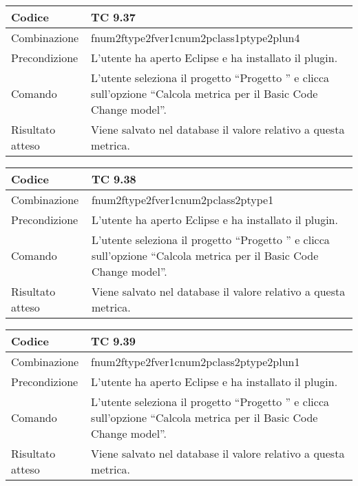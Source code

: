 \begin{table}[ht]
\begin{tabular}{|p{3cm}|p{9cm}|}
\hline
\cellcolor{lightgray}Codice				& TC 9.37								\\
\hline
\cellcolor{lightgray}Combinazione		& fnum2ftype2fver1cnum2pclass1ptype2plun4									\\
\hline
\cellcolor{lightgray}Precondizione		& L'utente ha aperto Eclipse e ha installato il plugin.		\\
\hline
\cellcolor{lightgray}Comando			& L'utente seleziona il progetto ``Progetto ''  e clicca sull'opzione ``Calcola metrica per il Basic Code Change model''.	\\
\hline
\cellcolor{lightgray}Risultato atteso	& Viene salvato nel database il valore relativo a questa metrica.\\
\hline
\end{tabular}
\end{table}

\begin{table}[ht]
\begin{tabular}{|p{3cm}|p{9cm}|}
\hline
\cellcolor{lightgray}Codice				& TC 9.38								\\
\hline
\cellcolor{lightgray}Combinazione		& fnum2ftype2fver1cnum2pclass2ptype1									\\
\hline
\cellcolor{lightgray}Precondizione		& L'utente ha aperto Eclipse e ha installato il plugin.		\\
\hline
\cellcolor{lightgray}Comando			& L'utente seleziona il progetto ``Progetto ''  e clicca sull'opzione ``Calcola metrica per il Basic Code Change model''.	\\
\hline
\cellcolor{lightgray}Risultato atteso	& Viene salvato nel database il valore relativo a questa metrica.\\
\hline
\end{tabular}
\end{table}

\begin{table}[ht]
\begin{tabular}{|p{3cm}|p{9cm}|}
\hline
\cellcolor{lightgray}Codice				& TC 9.39								\\
\hline
\cellcolor{lightgray}Combinazione		& fnum2ftype2fver1cnum2pclass2ptype2plun1									\\
\hline
\cellcolor{lightgray}Precondizione		& L'utente ha aperto Eclipse e ha installato il plugin.		\\
\hline
\cellcolor{lightgray}Comando			& L'utente seleziona il progetto ``Progetto ''  e clicca sull'opzione ``Calcola metrica per il Basic Code Change model''.	\\
\hline
\cellcolor{lightgray}Risultato atteso	& Viene salvato nel database il valore relativo a questa metrica.\\
\hline
\end{tabular}
\end{table}

